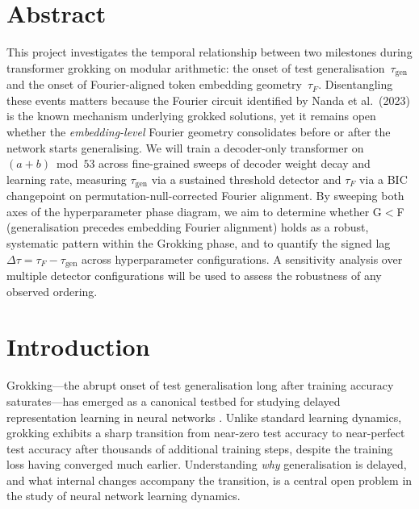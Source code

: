 \documentclass[12pt,openany,a4paper]{book}
\newcommand{\taug}{\tau_{\mathrm{gen}}}
\newcommand{\tauf}{\tau_{F}}
\newcommand{\Dtau}{\Delta\tau}
\begin{document}
\chapter{Abstract}

This project investigates the temporal relationship between two
milestones during transformer grokking on modular arithmetic:
the onset of test generalisation~$\taug$ and the onset of
Fourier-aligned token embedding geometry~$\tauf$.
Disentangling these events matters because the Fourier circuit
identified by Nanda et al.\ (2023) is the known mechanism underlying
grokked solutions, yet it remains open whether the \emph{embedding-level}
Fourier geometry consolidates before or after the network starts
generalising.
We will train a decoder-only transformer on $(a+b)\bmod 53$ across
fine-grained sweeps of decoder weight decay and learning rate,
measuring $\taug$ via a sustained threshold detector and $\tauf$ via a
BIC changepoint on permutation-null-corrected Fourier alignment.
By sweeping both axes of the hyperparameter phase diagram, we aim to
determine whether G$<$F (generalisation precedes embedding Fourier
alignment) holds as a robust, systematic pattern within the Grokking
phase, and to quantify the signed lag $\Dtau = \tauf - \taug$ across
hyperparameter configurations.
A sensitivity analysis over multiple detector configurations will be
used to assess the robustness of any observed ordering.

\tableofcontents

\listoffigures
{}

\listoftables
{}

\cleardoublepage
\mainmatter

\chapter{Introduction}

Grokking---the abrupt onset of test generalisation long after training
accuracy saturates---has emerged as a canonical testbed for studying
delayed representation learning in neural networks
\cite{power2022grokking}.
Unlike standard learning dynamics, grokking exhibits a sharp transition
from near-zero test accuracy to near-perfect test accuracy after
thousands of additional training steps, despite the training loss
having converged much earlier.
Understanding \emph{why} generalisation is delayed, and what internal
changes accompany the transition, is a central open problem in the
study of neural network learning dynamics.
\end{document}
